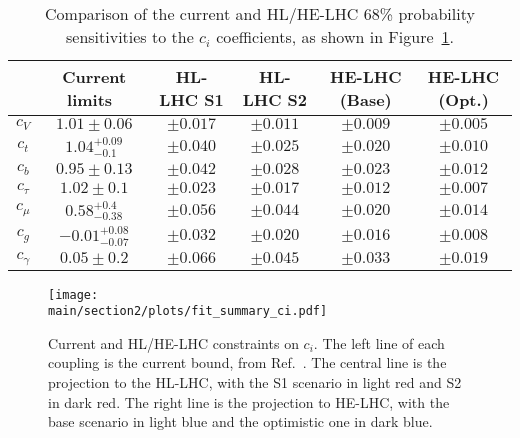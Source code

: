 \begin{table}[ht!]
\begin{center}
\caption{Comparison of the current and HL/HE-LHC 68\% probability sensitivities to the $c_{i}$ coefficients, as shown in Figure~\ref{fig:projection.ci}.}\label{tab:projection.ci}
\begin{tabular}{  c c c c c c }
  \hline\hline
  & Current limits~\cite{deBlas:2018tjm}  & HL-LHC S1 & HL-LHC S2 & HE-LHC (Base)&HE-LHC (Opt.) \\
  \hline
   $c_{V}$&$1.01\pm0.06$ &$\pm 0.017$&$\pm 0.011$&$\pm 0.009$&$\pm 0.005$\\
  $c_{t}$&$1.04^{+0.09}_{-0.1}$&$\pm 0.040$&$\pm 0.025$&$\pm 0.020$&$\pm 0.010$\\
  $c_{b}$&$0.95\pm0.13$ &$\pm 0.042$&$\pm 0.028$&$\pm 0.023$&$\pm 0.012$ \\
  $c_{\tau}$&$1.02\pm 0.1$ &$\pm 0.023$&$\pm 0.017$& $\pm 0.012$&$\pm 0.007$\\
  $c_{\mu}$&$0.58^{+0.4}_{-0.38} $ &$\pm 0.056$&$\pm 0.044$& $\pm 0.020$&$\pm 0.014$\\
  $c_{g}$&$-0.01^{+0.08}_{-0.07} $ &$\pm 0.032$&$\pm 0.020$& $\pm 0.016$&$\pm 0.008$\\
  $c_{\gamma}$ &$0.05\pm0.2 $&$\pm 0.066$&$\pm 0.045$&$\pm 0.033$&$\pm 0.019$\\
\hline\hline
\end{tabular}
\end{center}
\end{table}
%
\begin{figure}[ht]
\texttt{[image: \\main/section2/plots/fit\_summary\_ci.pdf]}
\caption{Current and HL/HE-LHC constraints on $c_{i}$. The left line of each coupling is the current bound, from Ref.~\cite{deBlas:2018tjm}. The central line is the projection to the HL-LHC, with the S1 scenario in light red and S2 in dark red. The right line is the projection to HE-LHC, with the base scenario in light blue and the optimistic one in dark blue.}\label{fig:projection.ci}
\end{figure}

